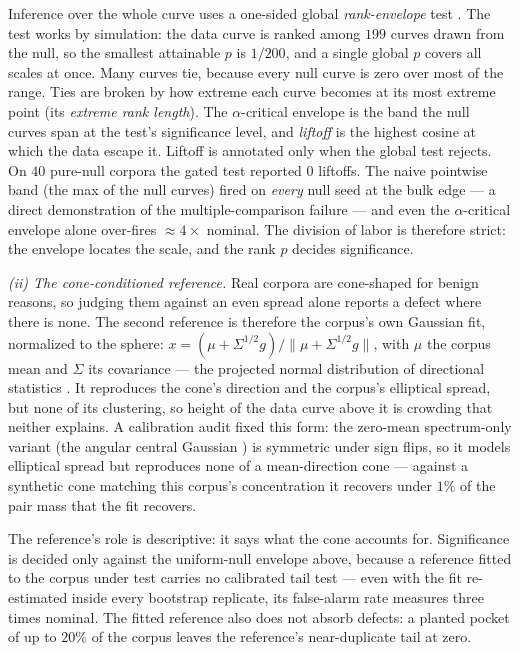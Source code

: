 \documentclass[11pt,letterpaper]{article}
\begin{document}
Inference over the whole curve uses a one-sided global
\emph{rank-envelope} test \cite{myllymaki2017}. The test works by
simulation: the data curve is ranked among $199$ curves drawn from the
null, so the smallest attainable $p$ is $1/200$, and a single global $p$
covers all scales at once. Many curves tie, because every null curve is
zero over most of the range. Ties are broken by how extreme each curve
becomes at its most extreme point (its \emph{extreme rank length}). The
$\alpha$-critical envelope is the band the null curves span at the test's
significance level, and \emph{liftoff} is the highest cosine at which the
data escape it. Liftoff is annotated only when the global test rejects. On
$40$ pure-null corpora the gated test reported $0$ liftoffs. The naive
pointwise band (the max of the null curves) fired on \emph{every} null
seed at the bulk edge --- a direct demonstration of the
multiple-comparison failure --- and even the $\alpha$-critical envelope
alone over-fires $\approx 4\times$ nominal. The division of labor is
therefore strict: the envelope locates the scale, and the rank $p$ decides
significance.

\emph{(ii) The cone-conditioned reference.} Real corpora are cone-shaped
for benign reasons, so judging them against an even spread alone reports
a defect where there is none. The second reference is therefore the
corpus's own Gaussian fit, normalized to the sphere:
$x = (\mu + \Sigma^{1/2} g)/\lVert \mu + \Sigma^{1/2} g\rVert$, with
$\mu$ the corpus mean and $\Sigma$ its covariance --- the projected
normal distribution of directional statistics \cite{mardia2000}. It
reproduces the cone's direction and the corpus's elliptical spread, but
none of its clustering, so height of the data curve above it is crowding
that neither explains. A calibration audit fixed this form: the
zero-mean spectrum-only variant (the angular central Gaussian
\cite{tyler1987}) is symmetric under sign flips, so it models elliptical
spread but reproduces none of a mean-direction cone --- against a
synthetic cone matching this corpus's concentration it recovers under
$1\%$ of the pair mass that the fit recovers.

The reference's role is descriptive: it says what the cone accounts for.
Significance is decided only against the uniform-null envelope above,
because a reference fitted to the corpus under test carries no calibrated
tail test --- even with the fit re-estimated inside every bootstrap
replicate, its false-alarm rate measures three times nominal. The fitted
reference also does not absorb defects: a planted pocket of up to $20\%$
of the corpus leaves the reference's near-duplicate tail at zero.
\end{document}
